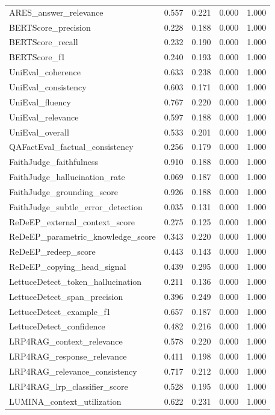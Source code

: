 \begin{table}
\begin{tabular}{lrrrr}
ARES_answer_relevance & 0.557 & 0.221 & 0.000 & 1.000 \\
BERTScore_precision & 0.228 & 0.188 & 0.000 & 1.000 \\
BERTScore_recall & 0.232 & 0.190 & 0.000 & 1.000 \\
BERTScore_f1 & 0.240 & 0.193 & 0.000 & 1.000 \\
UniEval_coherence & 0.633 & 0.238 & 0.000 & 1.000 \\
UniEval_consistency & 0.603 & 0.171 & 0.000 & 1.000 \\
UniEval_fluency & 0.767 & 0.220 & 0.000 & 1.000 \\
UniEval_relevance & 0.597 & 0.188 & 0.000 & 1.000 \\
UniEval_overall & 0.533 & 0.201 & 0.000 & 1.000 \\
QAFactEval_factual_consistency & 0.256 & 0.179 & 0.000 & 1.000 \\
FaithJudge_faithfulness & 0.910 & 0.188 & 0.000 & 1.000 \\
FaithJudge_hallucination_rate & 0.069 & 0.187 & 0.000 & 1.000 \\
FaithJudge_grounding_score & 0.926 & 0.188 & 0.000 & 1.000 \\
FaithJudge_subtle_error_detection & 0.035 & 0.131 & 0.000 & 1.000 \\
ReDeEP_external_context_score & 0.275 & 0.125 & 0.000 & 1.000 \\
ReDeEP_parametric_knowledge_score & 0.343 & 0.220 & 0.000 & 1.000 \\
ReDeEP_redeep_score & 0.443 & 0.143 & 0.000 & 1.000 \\
ReDeEP_copying_head_signal & 0.439 & 0.295 & 0.000 & 1.000 \\
LettuceDetect_token_hallucination & 0.211 & 0.136 & 0.000 & 1.000 \\
LettuceDetect_span_precision & 0.396 & 0.249 & 0.000 & 1.000 \\
LettuceDetect_example_f1 & 0.657 & 0.187 & 0.000 & 1.000 \\
LettuceDetect_confidence & 0.482 & 0.216 & 0.000 & 1.000 \\
LRP4RAG_context_relevance & 0.578 & 0.220 & 0.000 & 1.000 \\
LRP4RAG_response_relevance & 0.411 & 0.198 & 0.000 & 1.000 \\
LRP4RAG_relevance_consistency & 0.717 & 0.212 & 0.000 & 1.000 \\
LRP4RAG_lrp_classifier_score & 0.528 & 0.195 & 0.000 & 1.000 \\
LUMINA_context_utilization & 0.622 & 0.231 & 0.000 & 1.000 \\

\end{tabular}
\end{table}
